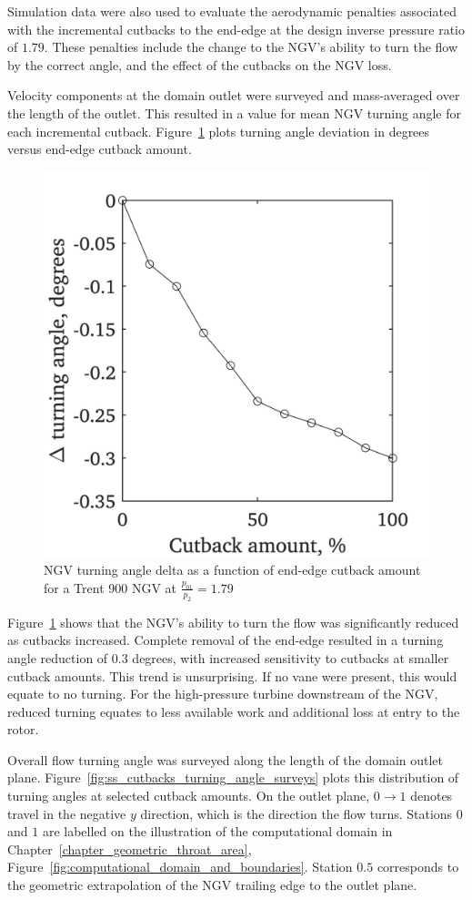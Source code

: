 \documentclass[a4paper, 11pt, oneside]{report}
\begin{document}
Simulation data were also used to evaluate the aerodynamic penalties associated with the incremental cutbacks to the end-edge at the design inverse pressure ratio of $1.79$. These penalties include the change to the NGV's ability to turn the flow by the correct angle, and the effect of the cutbacks on the NGV loss.

Velocity components at the domain outlet were surveyed and mass-averaged over the length of the outlet. This resulted in a value for mean NGV turning angle for each incremental cutback. Figure~\ref{fig:ss_cutbacks_vs_turning_angles} plots turning angle deviation in degrees versus end-edge cutback amount.

\begin{figure}[H]
	\centering
	\includegraphics[width=.45\textwidth]{figs/ss_cutbacks_vs_turning_angles.png}
	\caption{NGV turning angle delta as a function of end-edge cutback amount for a Trent 900 NGV at $\frac{p_{01}}{p_2}=1.79$}
    \label{fig:ss_cutbacks_vs_turning_angles}
\end{figure}

Figure~\ref{fig:ss_cutbacks_vs_turning_angles} shows that the NGV's ability to turn the flow was significantly reduced as cutbacks increased. Complete removal of the end-edge resulted in a turning angle reduction of $0.3$ degrees, with increased sensitivity to cutbacks at smaller cutback amounts. This trend is unsurprising. If no vane were present, this would equate to no turning. For the high-pressure turbine downstream of the NGV, reduced turning equates to less available work and additional loss at entry to the rotor.

Overall flow turning angle was surveyed along the length of the domain outlet plane. Figure~\ref{fig:ss_cutbacks_turning_angle_surveys} plots this distribution of turning angles at selected cutback amounts. On the outlet plane, $0\rightarrow1$ denotes travel in the negative $y$ direction, which is the direction the flow turns. Stations $0$ and $1$ are labelled on the illustration of the computational domain in Chapter~\ref{chapter_geometric_throat_area}, Figure~\ref{fig:computational_domain_and_boundaries}. Station $0.5$ corresponds to the geometric extrapolation of the NGV trailing edge to the outlet plane.
\end{document}
